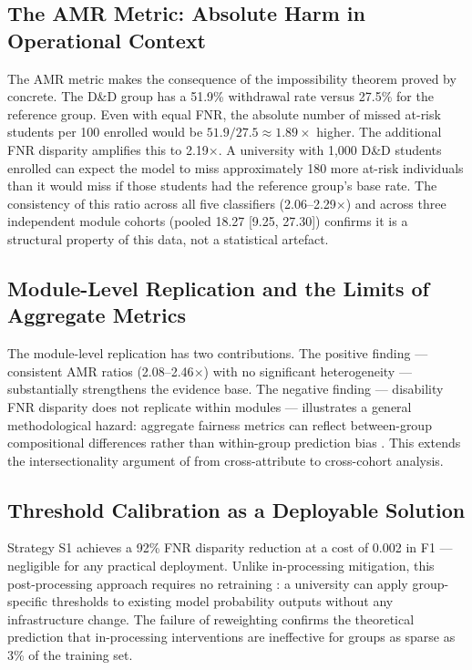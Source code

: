 \documentclass[12pt,a4paper]{article}
\begin{document}
\subsection{The AMR Metric: Absolute Harm in Operational Context}

The AMR metric makes the consequence of the impossibility theorem proved by
\citet{chouldechova2017} concrete. The D\&D group
has a 51.9\% withdrawal rate versus 27.5\% for the reference group. Even with
equal FNR, the absolute number of missed at-risk students per 100 enrolled
would be $51.9/27.5 \approx 1.89\times$ higher. The additional FNR disparity
amplifies this to 2.19$\times$. A university with 1,000 D\&D students enrolled
can expect the model to miss approximately 180 more at-risk individuals than
it would miss if those students had the reference group's base rate. The
consistency of this ratio across all five classifiers (2.06--2.29$\times$) and
across three independent module cohorts (pooled 18.27 [9.25, 27.30]) confirms
it is a structural property of this data, not a statistical artefact.

\subsection{Module-Level Replication and the Limits of Aggregate Metrics}

The module-level replication has two contributions. The positive finding ---
consistent AMR ratios (2.08--2.46$\times$) with no significant heterogeneity
--- substantially strengthens the evidence base. The negative finding ---
disability FNR disparity does not replicate within modules --- illustrates a
general methodological hazard: aggregate fairness metrics can reflect
between-group compositional differences rather than within-group prediction
bias \citep{gardner2018, simpson1951}. This extends the intersectionality
argument of \citet{crenshaw1989} from cross-attribute to cross-cohort analysis.

\subsection{Threshold Calibration as a Deployable Solution}

Strategy S1 achieves a 92\% FNR disparity reduction at a cost of 0.002 in F1
--- negligible for any practical deployment. Unlike in-processing mitigation,
this post-processing approach requires no retraining \citep{hardt2016}: a
university can apply group-specific thresholds to existing model probability
outputs without any infrastructure change. The failure of reweighting confirms
the theoretical prediction \citep{hardt2016} that in-processing interventions
are ineffective for groups as sparse as 3\% of the training set.
\end{document}
